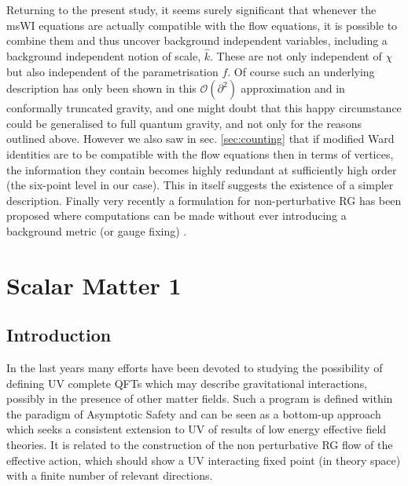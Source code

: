 \documentclass[11pt]{book} %
\newcommand{\hk}{\hat k}
\numberwithin{equation}{chapter}
\begin{document}
Returning to the present study, it seems surely significant that
whenever the msWI equations  are actually compatible with the flow equations,
it is possible to combine them and thus uncover background independent variables,
including a background independent notion of scale, $\hk$.
These are not only independent of $\chi$ but also independent of the parametrisation $f$.
Of course such an underlying description has only been shown in this $\mathcal{O}(\partial^2)$ approximation and
in conformally truncated gravity, and one might doubt that this happy circumstance could be generalised to
full quantum gravity, and not only for the reasons outlined above.
However we also saw in sec. \ref{sec:counting} that if modified Ward identities are to be compatible with
the flow equations then in terms of vertices, the information they contain becomes highly redundant
at sufficiently high order (the six-point level in our case).
This in itself suggests the existence of a simpler description.
Finally very recently a formulation for non-perturbative RG has been proposed where computations can be
made without ever introducing a background metric (or gauge fixing) \cite{Morris:2016nda}.




\chapter{Scalar Matter 1}

\section{Introduction}

In the last years many efforts have been devoted to studying the possibility of defining UV complete QFTs
which may describe gravitational interactions,
possibly in the presence of other matter fields.
Such a program is defined within the paradigm of Asymptotic Safety \cite{Weinberg:1980gg}
and can be seen as a bottom-up approach which seeks a consistent extension
to UV of results of low energy effective field theories.
It is related to the construction of the non perturbative RG flow of the effective action,
which should show a UV interacting fixed point (in theory space)
with a finite number of relevant directions.
\end{document}
